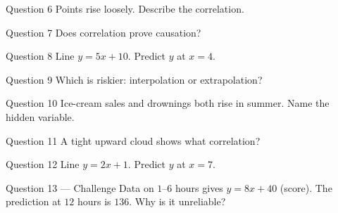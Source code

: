 \documentclass[11pt]{article}
\begin{document}
\begin{qbox}{Question 6}
Points rise loosely. Describe the correlation.\workspace{2.4cm}
\end{qbox}

\begin{qbox}{Question 7}
Does correlation prove causation?\workspace{2.4cm}
\end{qbox}

\begin{qbox}{Question 8}
Line $y=5x+10$. Predict $y$ at $x=4$.\workspace{2.4cm}
\end{qbox}

\begin{qbox}{Question 9}
Which is riskier: interpolation or extrapolation?\workspace{2.4cm}
\end{qbox}

\begin{qbox}{Question 10}
Ice-cream sales and drownings both rise in summer. Name the hidden variable.\workspace{2.4cm}
\end{qbox}

\begin{qbox}{Question 11}
A tight upward cloud shows what correlation?\workspace{2.4cm}
\end{qbox}

\begin{qbox}{Question 12}
Line $y=2x+1$. Predict $y$ at $x=7$.\workspace{2.4cm}
\end{qbox}

\begin{qbox}{Question 13 --- Challenge}
Data on $1$–$6$ hours gives $y=8x+40$ (score). The prediction at $12$ hours is $136$. Why is it unreliable?\workspace{3cm}
\end{qbox}

\clearpage
{}
\end{document}
